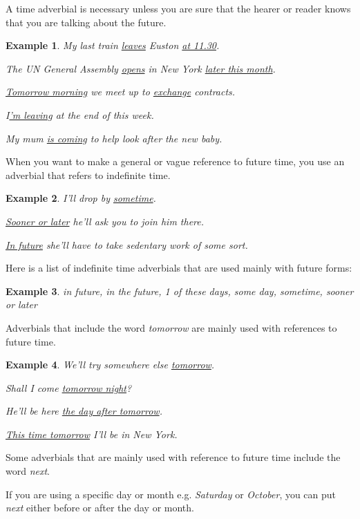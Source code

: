 \documentclass[oneside]{book}
\numberwithin{equation}{section}
\newtheorem{example}{Example}[section]
\begin{document}
A time adverbial is necessary unless you are sure that the hearer or reader knows that you are talking about the future.
\begin{example}
    My last train \underline{leaves} Euston \underline{at 11.30}.
    
    The UN General Assembly \underline{opens} in New York \underline{later this month}.
    
    \underline{Tomorrow morning} we meet up to \underline{exchange} contracts.
    
    I\underline{'m leaving} at the end of this week.
    
    My mum \underline{is coming} to help look after the new baby.
\end{example}
%
\noindent{} When you want to make a general or vague reference to future time, you use an adverbial that refers to indefinite time.
\begin{example}
    I'll drop by \underline{sometime}.
    
    \underline{Sooner or later} he'll ask you to join him there.
    
    \underline{In future} she'll have to take sedentary work of some sort.
\end{example}
Here is a list of indefinite time adverbials that are used mainly with future forms:
\begin{example}
    in future, in the future, 1 of these days, some day, sometime, sooner or later
\end{example}
%
\noindent{} Adverbials that include the word \textit{tomorrow} are mainly used with references to future time.
\begin{example}
    We'll try somewhere else \underline{tomorrow}.
    
    Shall I come \underline{tomorrow night}?
    
    He'll be here \underline{the day after tomorrow}.
    
    \underline{This time tomorrow} I'll be in New York.
\end{example}
%
\noindent{} Some adverbials that are mainly used with reference to future time include the word \textit{next}.

If you are using a specific day or month e.g. \textit{Saturday} or \textit{October}, you can put \textit{next} either before or after the day or month.
\end{document}
